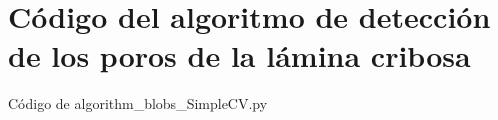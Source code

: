 \chapter{Código del algoritmo de detección de los poros de la lámina
  cribosa}

\begin{codigo_python}
\caption{Código de algorithm\_blobs\_SimpleCV.py}
  \inputminted[fontsize=\tiny,linenos]{python}{../OpenCV/algorithm_blobs_SimpleCV.py}
\end{codigo_python}